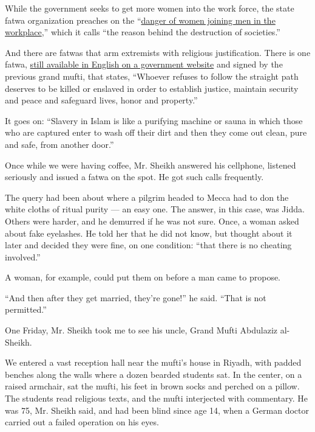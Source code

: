 While the government seeks to get more women into the work force, the
state fatwa organization preaches on the
``\href{http://alifta.com/Fatawa/fatawaChapters.aspx?languagename=en\&View=Page\&PageID=75\&PageNo=1\&BookID=14\&TopFatawa=true}{danger
of women joining men in the workplace},'' which it calls ``the reason
behind the destruction of societies.''

And there are fatwas that arm extremists with religious justification.
There is one fatwa,
\href{http://alifta.com/Fatawa/fatawacoeval.aspx?languagename=en\&View=Page\&HajjEntryID=0\&HajjEntryName=\&RamadanEntryID=0\&RamadanEntryName=\&NodeID=4661\&PageID=6286\&SectionID=7\&SubjectPageTitlesID=6338\&MarkIndex=0\&0\#WhydoesIslamnotprohibitslavery}{still
available in English on a government website} and signed by the previous
grand mufti, that states, ``Whoever refuses to follow the straight path
deserves to be killed or enslaved in order to establish justice,
maintain security and peace and safeguard lives, honor and property.''

It goes on: ``Slavery in Islam is like a purifying machine or sauna in
which those who are captured enter to wash off their dirt and then they
come out clean, pure and safe, from another door.''

Once while we were having coffee, Mr. Sheikh answered his cellphone,
listened seriously and issued a fatwa on the spot. He got such calls
frequently.

The query had been about where a pilgrim headed to Mecca had to don the
white cloths of ritual purity --- an easy one. The answer, in this case,
was Jidda. Others were harder, and he demurred if he was not sure. Once,
a woman asked about fake eyelashes. He told her that he did not know,
but thought about it later and decided they were fine, on one condition:
``that there is no cheating involved.''

A woman, for example, could put them on before a man came to propose.

``And then after they get married, they're gone!'' he said. ``That is
not permitted.''

One Friday, Mr. Sheikh took me to see his uncle, Grand Mufti Abdulaziz
al-Sheikh.

We entered a vast reception hall near the mufti's house in Riyadh, with
padded benches along the walls where a dozen bearded students sat. In
the center, on a raised armchair, sat the mufti, his feet in brown socks
and perched on a pillow. The students read religious texts, and the
mufti interjected with commentary. He was 75, Mr. Sheikh said, and had
been blind since age 14, when a German doctor carried out a failed
operation on his eyes.

